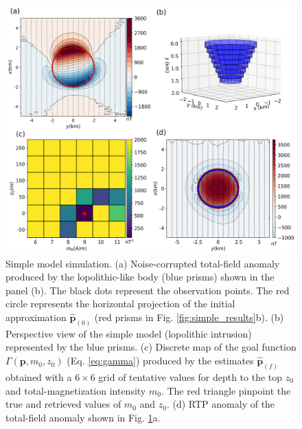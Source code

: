 \begin{figure}
    \centering
    \includegraphics[width=\linewidth]{figures/simple_model_data.png}
    \caption{Simple model simulation. (a) Noise-corrupted total-field anomaly produced by the lopolithic-like body (blue prisms) shown in the panel (b). The black dots represent the observation points. The red circle represents the horizontal projection 
    of the initial approximation $\hat{\mathbf{p}}_{(0)}$
    (red prisms in Fig. \ref{fig:simple_results}b).
    (b) Perspective view of the simple model (lopolithic intrusion) represented by the blue prisms. 
    (c) Discrete map of the goal function $\Gamma(\mathbf{p}, m_0, z_0)$ (Eq.
    \ref{eq:gamma}) produced by the estimates $\hat{\mathbf{p}}_{(f)}$ obtained with
    a $6 \times 6$ grid of tentative values for depth to the top $z_0$ and
    total-magnetization intensity $m_0$.
    The red triangle pinpoint the true and retrieved 	   
    values of $m_0$  and $z_0$. (d) RTP anomaly of the total-field anomaly shown in 
    Fig. \ref{fig:simple_model}a.
}
    \label{fig:simple_model}
\end{figure}


